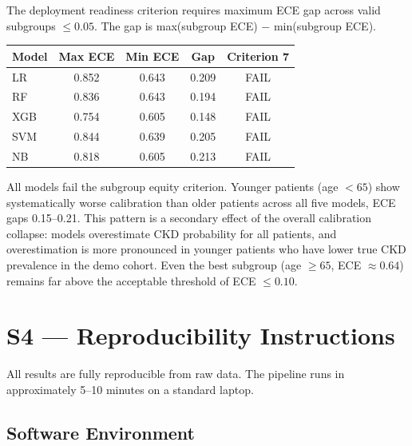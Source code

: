 \documentclass[11pt]{article}
\begin{document}
The deployment readiness criterion requires maximum ECE gap across valid
subgroups $\leq 0.05$. The gap is max(subgroup ECE) $-$ min(subgroup ECE).

\begin{center}
\begin{tabular}{lcccc}
\toprule
Model & Max ECE & Min ECE & Gap & Criterion 7 \\
\midrule
LR  & 0.852 & 0.643 & 0.209 & FAIL \\
RF  & 0.836 & 0.643 & 0.194 & FAIL \\
XGB & 0.754 & 0.605 & 0.148 & FAIL \\
SVM & 0.844 & 0.639 & 0.205 & FAIL \\
NB  & 0.818 & 0.605 & 0.213 & FAIL \\
\bottomrule
\end{tabular}
\end{center}

All models fail the subgroup equity criterion. Younger patients (age $<65$)
show systematically worse calibration than older patients across all five
models, ECE gaps 0.15--0.21. This pattern is a secondary effect of the
overall calibration collapse: models overestimate CKD probability for all
patients, and overestimation is more pronounced in younger patients who have
lower true CKD prevalence in the demo cohort. Even the best subgroup
(age $\geq 65$, ECE $\approx 0.64$) remains far above the acceptable
threshold of ECE $\leq 0.10$.

\clearpage

\section*{S4 — Reproducibility Instructions}

All results are fully reproducible from raw data. The pipeline runs in
approximately 5--10 minutes on a standard laptop.

\subsection*{Software Environment}
\end{document}

